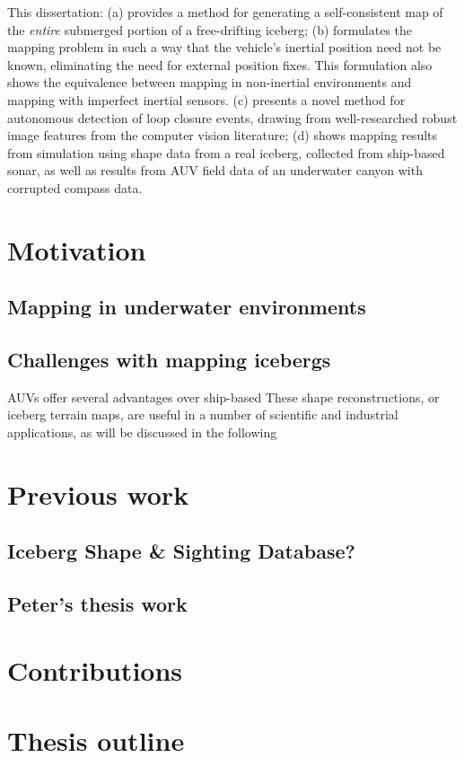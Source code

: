 This dissertation: (a) provides a method for generating a self-consistent map of the \emph{entire} submerged portion of a free-drifting iceberg; (b) formulates the mapping problem in such a way that the vehicle's inertial position need not be known, eliminating the need for external position fixes. This formulation also shows the equivalence between mapping in non-inertial environments and mapping with imperfect inertial sensors. (c) presents a novel method for autonomous detection of loop closure events, drawing from well-researched robust image features from the computer vision literature; (d) shows mapping results from simulation using shape data from a real iceberg, collected from ship-based sonar, as well as results from AUV field data of an underwater canyon with corrupted compass data. 



\section{Motivation}

\subsection{Mapping in underwater environments}
\subsection{Challenges with mapping icebergs}

AUVs offer several advantages over ship-based These shape reconstructions, or iceberg terrain maps, are useful in a number of scientific and industrial applications, as will be discussed in the following 

\section{Previous work}


\subsection{Iceberg Shape \& Sighting Database?}
\subsection{Peter's thesis work}


\section{Contributions}

\section{Thesis outline}
